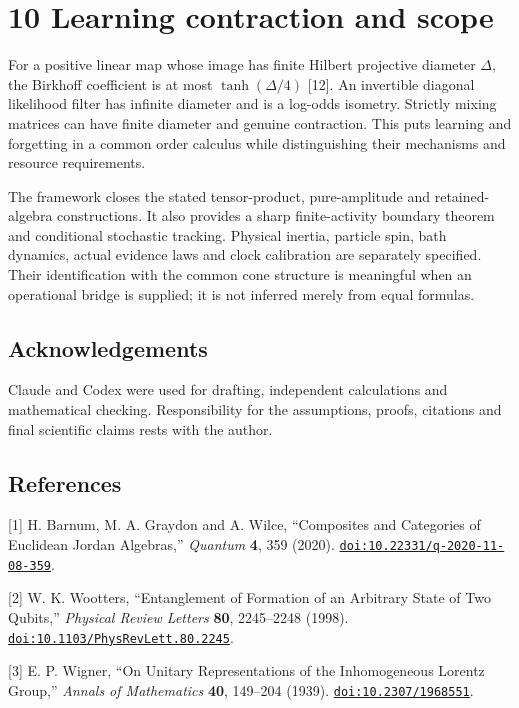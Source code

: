 \documentclass[
  11pt,
  a4paper,
]{article}
\begin{document}
\section{10 Learning contraction and scope}\label{learning-contraction-and-scope}

For a positive linear map whose image has finite Hilbert projective diameter \(\Delta\), the Birkhoff coefficient is at most \(\tanh(\Delta/4)\) {[}12{]}. An invertible diagonal likelihood filter has infinite diameter and is a log-odds isometry. Strictly mixing matrices can have finite diameter and genuine contraction. This puts learning and forgetting in a common order calculus while distinguishing their mechanisms and resource requirements.

The framework closes the stated tensor-product, pure-amplitude and retained-algebra constructions. It also provides a sharp finite-activity boundary theorem and conditional stochastic tracking. Physical inertia, particle spin, bath dynamics, actual evidence laws and clock calibration are separately specified. Their identification with the common cone structure is meaningful when an operational bridge is supplied; it is not inferred merely from equal formulas.

\subsection{Acknowledgements}\label{acknowledgements}

Claude and Codex were used for drafting, independent calculations and mathematical checking. Responsibility for the assumptions, proofs, citations and final scientific claims rests with the author.

\subsection{References}\label{references}

{[}1{]} H. Barnum, M. A. Graydon and A. Wilce, ``Composites and Categories of Euclidean Jordan Algebras,'' \emph{Quantum} \textbf{4}, 359 (2020). \href{https://doi.org/10.22331/q-2020-11-08-359}{\nolinkurl{doi:10.22331/q-2020-11-08-359}}.

{[}2{]} W. K. Wootters, ``Entanglement of Formation of an Arbitrary State of Two Qubits,'' \emph{Physical Review Letters} \textbf{80}, 2245--2248 (1998). \href{https://doi.org/10.1103/PhysRevLett.80.2245}{\nolinkurl{doi:10.1103/PhysRevLett.80.2245}}.

{[}3{]} E. P. Wigner, ``On Unitary Representations of the Inhomogeneous Lorentz Group,'' \emph{Annals of Mathematics} \textbf{40}, 149--204 (1939). \href{https://doi.org/10.2307/1968551}{\nolinkurl{doi:10.2307/1968551}}.
\end{document}
